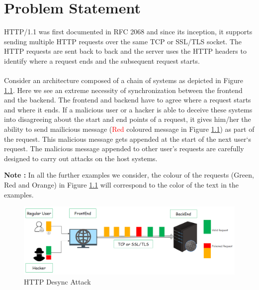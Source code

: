 \chapter{Problem Statement}
HTTP/1.1 was first documented in RFC 2068 \cite{b9} and since its inception, it supports sending multiple HTTP requests over the same TCP or SSL/TLS socket. The HTTP requests are sent back to back and the server uses the HTTP headers to identify where a request ends and the subsequent request starts. \\\\
Consider an architecture composed of a chain of systems as depicted in Figure \ref{fig:HTTP Desync Attack}. Here we see an extreme necessity of synchronization between the frontend and the backend. The frontend and backend have to agree where a request starts and where it ends. If a malicious user or a hacker is able to deceive these systems into disagreeing about the start and end points of a request, it gives him/her the ability to send mailicious message (\textcolor{red}{Red} coloured message in Figure \ref{fig:HTTP Desync Attack}) as part of the request. This malicious message gets appended at the start of the next user`s request. The malicious message appended to other user's requests are carefully designed to carry out attacks on the host systems. 

\textbf{Note : }In all the further examples we consider, the colour of the requests (\textcolor{mygreen}{Green}, \textcolor{myred}{Red} and \textcolor{myorange}{Orange}) in Figure \ref{fig:HTTP Desync Attack} will correspond to the color of the text in the examples. 
\begin{figure}
	\includegraphics[width=14cm]{images/HTTP_Desync}
	\caption{HTTP Desync Attack}
	\label{fig:HTTP Desync Attack}
\end{figure}


